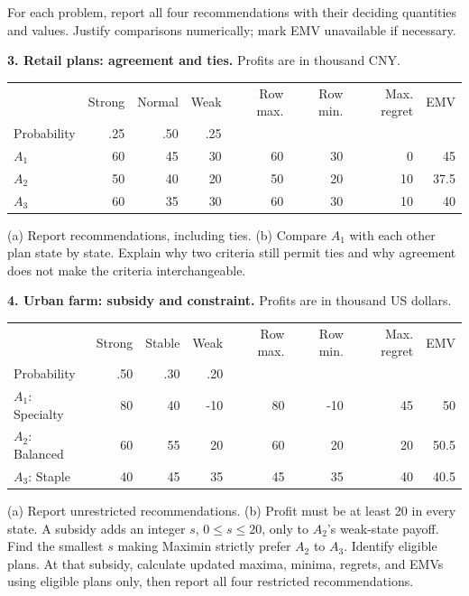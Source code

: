 For each problem, report all four recommendations with their deciding quantities and values. Justify comparisons numerically; mark EMV unavailable if necessary.

\textbf{3. Retail plans: agreement and ties.} Profits are in thousand CNY.
\begin{center}\begin{tabular}{lrrr|rrrr}\toprule
& Strong & Normal & Weak & Row max. & Row min. & Max. regret & EMV\\
Probability & .25 & .50 & .25 &&&&\\\midrule
$A_1$ &60&45&30&60&30&0&45\\
$A_2$ &50&40&20&50&20&10&37.5\\
$A_3$ &60&35&30&60&30&10&40\\\bottomrule
\end{tabular}\end{center}
(a) Report recommendations, including ties. (b) Compare $A_1$ with each other plan state by state. Explain why two criteria still permit ties and why agreement does not make the criteria interchangeable.
\choices\answerlines

\textbf{4. Urban farm: subsidy and constraint.} Profits are in thousand US dollars.
\begin{center}\begin{tabular}{lrrr|rrrr}\toprule
& Strong & Stable & Weak & Row max. & Row min. & Max. regret & EMV\\
Probability & .50 & .30 & .20 &&&&\\\midrule
$A_1$: Specialty &80&40&-10&80&-10&45&50\\
$A_2$: Balanced &60&55&20&60&20&20&50.5\\
$A_3$: Staple &40&45&35&45&35&40&40.5\\\bottomrule
\end{tabular}\end{center}
(a) Report unrestricted recommendations. (b) Profit must be at least 20 in every state. A subsidy adds an integer $s$, $0\leq s\leq20$, only to $A_2$'s weak-state payoff. Find the smallest $s$ making Maximin strictly prefer $A_2$ to $A_3$. Identify eligible plans. At that subsidy, calculate updated maxima, minima, regrets, and EMVs using eligible plans only, then report all four restricted recommendations.
\answerlines\answerlines

